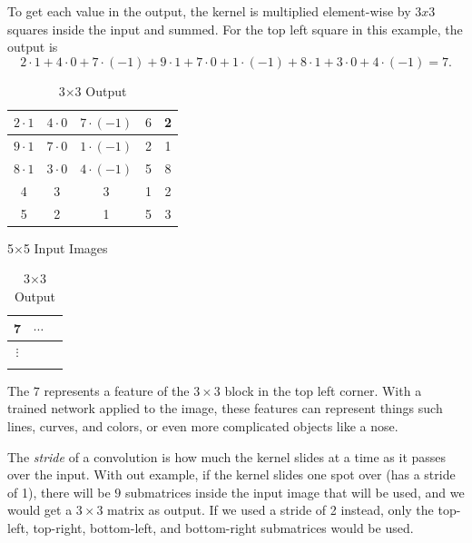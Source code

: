 \noindent
To get each value in the output, the kernel is multiplied element-wise by $3x3$ squares inside the input and summed.
For the top left square in this example, the output is 
\[
2\cdot 1 + 4\cdot 0 + 7\cdot (-1) + 9\cdot 1 + 7\cdot 0 + 1\cdot (-1) + 8\cdot 1 + 3\cdot 0 + 4\cdot (-1) = 7.
\]
\begin{table}[H]
\parbox{.45\linewidth}{
\centering
\begin{tabular}{|c|c|c|c|c|}
\hline
$2\cdot 1$ & $4\cdot 0$ & $7\cdot (-1)$ & $6$ & 2\\
\hline
$9\cdot 1$ & $7\cdot0$ & $1\cdot (-1)$ & 2 & 1\\
\hline
$8\cdot 1$ & $3\cdot0$ & $4\cdot (-1)$ & 5 & 8\\
\hline
4 & 3 & 3 & 1 & 2\\
\hline
5 & 2 & 1 & 5 & 3\\
\hline
\end{tabular}
\label{tab:input}
\caption*{5$\times$5 Input Images}
}
\hfill
\parbox{.45\linewidth}{
\centering
\begin{tabular}{|c|c|c|}
\hline
7 & \(\cdots\) & \\
\hline
\(\vdots\) &  & \\
\hline
 & & \\
\hline
\end{tabular}
\label{tab:input}
\caption*{3$\times $3 Output}
}
\end{table}
\noindent
The $7$ represents a feature of the $3\times 3$ block in the top left corner. 
With a trained network applied to the image, these features can represent things such lines, curves, and colors, or even more complicated objects like a nose.

The \emph{stride} of a convolution is how much the kernel slides at a time as it passes over the input.
With out example, if the kernel slides one spot over (has a stride of 1), there will be $9$ submatrices inside the input image that will be used, and we would get a \(3\times 3\) matrix as output.
If we used a stride of 2 instead, only the top-left, top-right, bottom-left, and bottom-right submatrices would be used.

